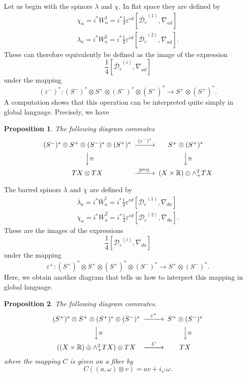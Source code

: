 \documentclass[twoside]{amsart}
\newcommand{\RR}{\ensuremath{\mathbb{R}}}
\newtheorem{prop}{Proposition}
\renewcommand{\epsilon}{\varepsilon}
\newcommand{\enm}[1]{\ensuremath{#1}}
\renewcommand{\bar}[1]{\overline{#1}}
\newcommand{\onetwoij}[2]{\enm{#1^{(#2)}}}
\newcommand{\dievencov}[2]{\enm{\nabla_{#1\dot{#2}}}}
\newcommand{\odicov}[1]{\enm{\mathcal{D}_{#1}}}
\newcommand{\odicjcov}[1]{\enm{\bar{\mathcal{D}}_{\dot{#1}}}}
\newcommand{\odijcov}[2]{\onetwoij{\odicov{#2}}{#1}}
\newcommand{\odijcjcov}[2]{\onetwoij{\odicjcov{#2}}{#1}}
\newcommand{\spl}{\enm{S^{+}}}
\newcommand{\sm}{\enm{S^{-}}}
\newcommand{\spd}{\enm{(\spl)^{*}}}
\newcommand{\smd}{\enm{(\sm)^{*}}}
\newcommand{\eps}{\enm{\epsilon}}
\renewcommand{\epsilon}{\varepsilon}
\begin{document}
Let us begin with the spinors \( \lambda \) and \( \chi \).  In flat
space they are defined by
\begin{gather}
\chi_{a} = i^{*} W^{1}_{a} = i^{*}
\frac{1}{4}\eps^{\dot{c}\dot{d}} [\odijcjcov{1}{c}, \dievencov{a}{d}]
\\
\lambda_{a} = i^{*} W^{2}_{a} = i^{*}
\frac{1}{4}\eps^{\dot{c}\dot{d}} [\odijcjcov{2}{c}, \dievencov{a}{d}].
\end{gather}
These can therefore equivalently be defined as the image of the expression
\[ \frac{1}{4}[\odijcjcov{i}{c}, \dievencov{a}{d}] \]
under the mapping
\[
(\eps^{-})^{*}:\smd\otimes\spl\otimes\smd\otimes\spd\to\spl\otimes\spd.
\]
A computation shows that this operation can be interpreted quite
simply in global language.  Precisely, we have
\begin{prop}
\label{prop:mapsforw}
    The following diagram commutes
    \begin{equation}
        \begin{CD}
            \smd\otimes\spl\otimes\smd\otimes\spd @>(\eps^{-})^{*}>>
            \spl\otimes\spd \\
            @VV\cong V            @VV\cong V \\
            TX\otimes TX @>\mathrm{proj.}>>
(X\times\RR)\oplus\wedge^{2}_{+}TX
        \end{CD}
        \label{eq:mapsforw}
    \end{equation}
\end{prop}

The barred spinors \( \bar{\lambda} \) and \( \bar{\chi} \) are
defined by
\begin{gather}
    \overline{\lambda}_{\dot{a}} = i^{*} \overline{W}^{1}_{\dot{a}} =
i^{*}
    \frac{1}{4}\eps^{cd} [\odijcov{1}{c}, \dievencov{d}{a}]
    \label{eq:lambda}\\
    \overline{\chi}_{\dot{a}} = i^{*} \overline{W}^{2}_{\dot{a}} =
i^{*}
    \frac{1}{4}\eps^{cd} [\odijcov{2}{c},
    \dievencov{d}{a}].\label{eq:chi}
\end{gather}
These are the images of the expressions
\[ \frac{1}{4}[\odijcov{i}{c}, \dievencov{d}{a}] \]
under the mapping
\[ \epsilon^{+}: \spd\otimes\spl\otimes\spd\otimes\smd \to
\spl\otimes\smd. \]
Here, we obtain another diagram that tells us how to interpret this
mapping in global language.
\begin{prop}
\label{prop:mapsforwbar}
The following diagram commutes.
\begin{equation}
    \begin{CD}
        \spd\otimes\spl\otimes\spd\otimes\smd @>\eps^{+}>>
        \spl\otimes\smd \\
        @VV\cong V            @VV\cong V \\
        ((X\times\RR)\oplus\wedge^{2}_{+}TX)\otimes TX@>C>> TX
    \end{CD}
    \label{eq:mapsforwbar}
\end{equation}
where the mapping \( C \) is given on a fiber by
\begin{equation}
    C((a, \omega)\otimes v) = av + i_{v^{*}}\omega.
\end{equation}
\end{prop}
\end{document}
